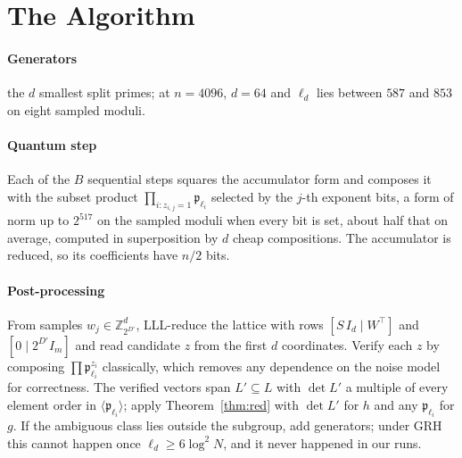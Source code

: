 \documentclass[runningheads]{llncs}
\newcommand{\Z}{\mathbb{Z}}
\newcommand{\p}{\mathfrak{p}}
\begin{document}
\section{The Algorithm}\label{sec:alg}
\paragraph{Generators} the $d$ smallest split primes; at $n=4096$, $d=64$ and $\ell_d$ lies between $587$ and $853$ on eight sampled moduli.

\paragraph{Quantum step} Each of the $B$ sequential steps squares the accumulator form and composes it with the subset product $\prod_{i:z_{i,j}=1}\p_{\ell_i}$ selected by the $j$-th exponent bits, a form of norm up to $2^{517}$ on the sampled moduli when every bit is set, about half that on average, computed in superposition by $d$ cheap compositions. The accumulator is reduced, so its coefficients have $n/2$ bits.

\paragraph{Post-processing} From samples $w_j\in\Z_{2^{D'}}^d$, LLL-reduce the lattice with rows $[S\,I_d\mid W^\top]$ and $[0\mid2^{D'}I_m]$ and read candidate $z$ from the first $d$ coordinates. Verify each $z$ by composing $\prod\p_{\ell_i}^{z_i}$ classically, which removes any dependence on the noise model for correctness. The verified vectors span $L'\subseteq L$ with $\det L'$ a multiple of every element order in $\langle\p_{\ell_i}\rangle$; apply Theorem~\ref{thm:red} with $\det L'$ for $h$ and any $\p_{\ell_i}$ for $g$. If the ambiguous class lies outside the subgroup, add generators; under GRH this cannot happen once $\ell_d\ge6\log^2N$, and it never happened in our runs.
\end{document}
